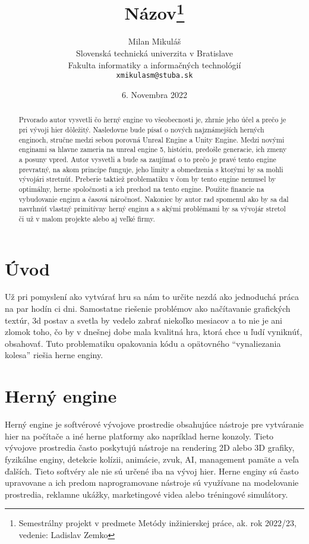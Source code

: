 \documentclass[10pt,twoside,slovak,a4paper]{article}
\title{Názov\thanks{Semestrálny projekt v predmete Metódy inžinierskej práce, ak. rok 2022/23, vedenie: Ladislav Zemko}} %
\author{Milan Mikuláš\\[2pt]
	{\small Slovenská technická univerzita v Bratislave}\\
	{\small Fakulta informatiky a informačných technológií}\\
	{\small \texttt{xmikulasm@stuba.sk}}
	}
\date{\small 6. Novembra 2022}
\begin{document}
\maketitle

\begin{abstract}
\cite{abs}Prvorado autor vysvetli čo herný engine vo všeobecnosti je, zhrnie jeho účel a prečo je pri vývoji hier dôležitý. Nasledovne bude písať o nových najznámejších herných enginoch, stručne medzi sebou porovná Unreal Engine a Unity Engine. Medzi novými enginami sa hlavne zameria na unreal engine 5, históriu, predošle generacie, ich zmeny a posuny vpred. Autor vysvetli a bude sa zaujímať o to prečo je pravé tento engine prevratný, na akom princípe funguje, jeho limity a obmedzenia s ktorými by sa mohli vývojári stretnúť. Preberie taktiež problematiku v čom by tento engine nemusel by optimálny, herne spoločnosti a ich prechod na tento engine. Použite financie na vybudovanie enginu a časová náročnosť. Nakoniec by autor rad spomenul ako by sa dal navrhnúť vlastný primitívny herný enginu a s akými problémami by sa vývojár stretol či už v malom projekte alebo aj veľké firmy.
\end{abstract}



\section{Úvod} 

Už pri pomyslení ako vytvárať hru sa nám to určite nezdá ako jednoduchá práca na par hodín ci dni. Samostatne riešenie problémov ako načítavanie grafických textúr, 3d postav a svetla by vedelo zabrať niekoľko mesiacov a to nie je ani zlomok toho, čo by v dnešnej dobe mala kvalitná hra, ktorá chce u ľudí vyniknúť, obsahovať. Tuto problematiku opakovania kódu a opätovného “vynaliezania kolesa” riešia herne enginy.

\section{Herný engine} 

Herný engine je softvérové vývojove prostredie obsahujúce nástroje pre vytváranie hier na počítače a iné herne platformy ako napríklad herne konzoly. Tieto vývojove prostredia často poskytujú nástroje na rendering 2D alebo 3D grafiky, fyzikálne enginy, detekcie kolízii, animácie, zvuk, AI, management pamäte a veľa ďalších. Tieto softvéry ale nie sú určené iba na vývoj hier. Herne enginy sú často upravovane a ich predom naprogramovane nástroje sú využívane na modelovanie prostredia, reklamne ukážky, marketingové videa alebo tréningové simulátory.
\cite{herne-enginy}
\end{document}
